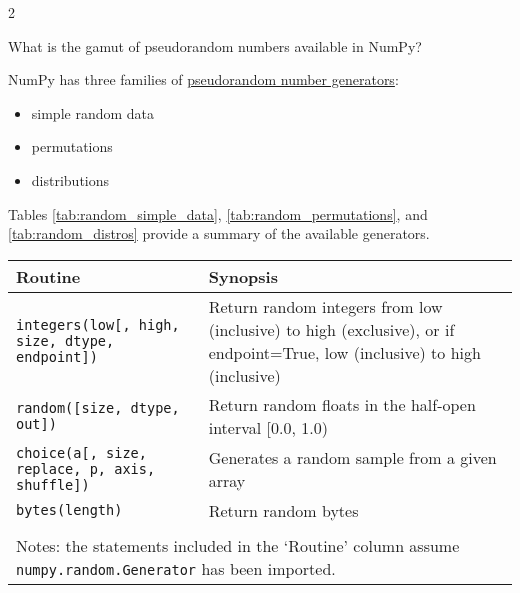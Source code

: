 \documentclass[a4paper,11pt]{book}
\numberwithin{figure}{chapter}
\numberwithin{table}{chapter}
\newcommand{\question}[1]{%
    \begin{tcolorbox}[colback=comp_c!10,colframe=comp_c,sidebyside align=top,width=\linewidth,before skip=1ex]
        #1
    \end{tcolorbox}
    \switchcolumn%
}
\newcommand{\note}[1]{%
    \begin{tcolorbox}[colback=white!0,colframe=white!10,width=\linewidth,before skip=1ex]
        #1
    \end{tcolorbox}
}
\begin{document}
\begin{paracol}{2}
	\question{\raggedright What is the gamut of pseudorandom numbers available in NumPy?}
	\note{NumPy has three families of \href{https://numpy.org/doc/stable/reference/random/generator.html}{pseudorandom number generators}:
	\begin{itemize}
		\item simple random data 
		\item permutations
		\item distributions
	\end{itemize}
	Tables \ref{tab:random_simple_data}, \ref{tab:random_permutations}, and \ref{tab:random_distros} provide a summary of the available generators.
	}
\end{paracol}

\begin{sidewaystable}[!htbp]
	\centering
	\caption{NumPy Pseudorandom Generators: Simple Random Data} 
	\label{tab:random_simple_data}
	\begin{tabular}{lp{12cm}}
		\toprule \toprule
			Routine & Synopsis \\
			\midrule
			\texttt{integers(low[, high, size, dtype, endpoint])} & 
                        Return random integers from low (inclusive) to high (exclusive), or if endpoint=True, low (inclusive) to high (inclusive)\\
                        \texttt{random([size, dtype, out])} &
                        Return random floats in the half-open interval [0.0, 1.0)\\
                        \texttt{choice(a[, size, replace, p, axis, shuffle])} &
                        Generates a random sample from a given array\\
                        \texttt{bytes(length)} &
                        Return random bytes\\
	     	\bottomrule \\[-1.8ex]
	        \multicolumn{2}{l}{Notes: the statements included in the `Routine' column assume \texttt{numpy.random.Generator} has been imported.} \\
	\end{tabular}
\end{sidewaystable}
\end{document}
